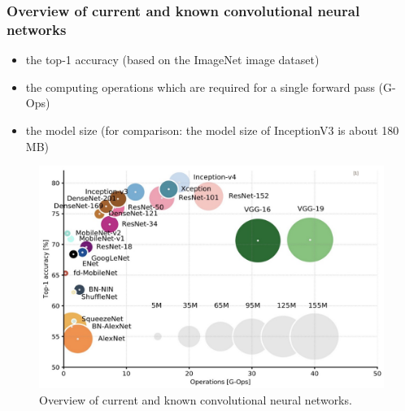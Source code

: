 \documentclass[10pt]{article}
\newif\ifen
\newif\ifde
\newcommand{\en}[1]{\ifen#1\fi}
\newcommand{\de}[1]{\ifde#1\fi}
\begin{document}
				\de{Welchen Vorteil ein vortrainiertes Netzwerk hat, kann man in dieser Arbeit im Kapitel ``\nameref{sec:section_use_of_the_transfer_learning_approach}" einsehen.}
				\en{The advantage of a pre-trained network can be seen in the chapter ``\nameref{sec:section_use_of_the_transfer_learning_approach}" of this thesis.}
			
			\subsubsection{Overview of current and known convolutional neural networks}
				\de{Zu guter Letzt folgen hier noch ein paar aktuelle und bekannte Convolutional Neuronal networks. Sie unterscheiden sich hauptsächlich in folgenden Metriken, wobei in Kombination jedes Netzwerk seine Vor- und Nachteile besitzt:}
				\en{Last but not least, here are a few current and well-known convolutional neural networks. They differ mainly in the following metrics, whereby in combination each network has its advantages and disadvantages:}

				\begin{itemize}
					\item the top-1 accuracy (based on the ImageNet image dataset)
					\item the computing operations which are required for a single forward pass (G-Ops)
					\item the model size (for comparison: the model size of InceptionV3 is about 180 MB)
				\end{itemize}
		
				\begin{figure}[H]
					\centering
					\includegraphics[width=1.0\textwidth]{images/tl_models}
					\caption[Overview of current and known convolutional neural networks.]{Overview of current and known convolutional neural networks.\footnotemark}
					\label{fig:comparison_cnn}
				\end{figure}
\end{document}

